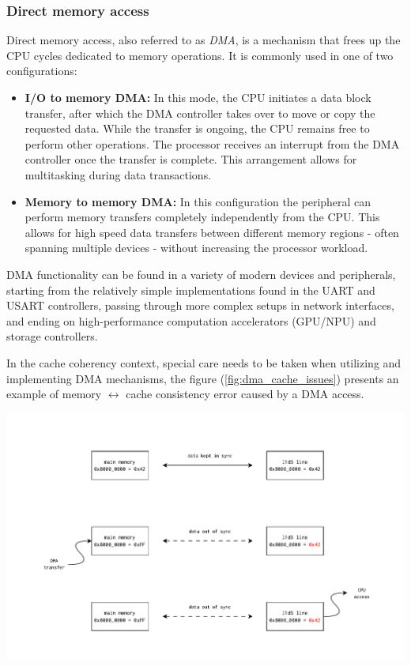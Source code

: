 \subsubsection{Direct memory access} \label{sec:dma}
Direct memory access, also referred to as \textit{DMA}, is a mechanism that
frees up the CPU cycles dedicated to memory operations. It is commonly used 
in one of two configurations:

\begin{itemize}
	\item \textbf{I/O to memory DMA:} In this mode, the CPU initiates a data block
		transfer, after which the DMA controller takes over to move or copy the requested data.
		While the transfer is ongoing, the CPU remains free to perform other operations.
		The processor receives an interrupt from the DMA controller once the transfer is complete.
		This arrangement allows for multitasking during data transactions.
	\item \textbf{Memory to memory DMA:} In this configuration the peripheral can perform memory
		transfers completely independently from the CPU. This allows for high speed data transfers
		between different memory regions - often spanning multiple devices - without increasing
		the processor workload.
\end{itemize}

\noindent DMA functionality can be found in a variety of modern devices and
peripherals, starting from the relatively simple implementations found in the
UART and USART controllers, passing through more complex setups in network
interfaces, and ending on high-performance computation accelerators (GPU/NPU)
and storage controllers.

\noindent In the cache coherency context, special care needs to be
taken when utilizing and implementing DMA mechanisms, the figure
(\ref{fig:dma_cache_issues}) presents an example of memory $\leftrightarrow$
cache consistency error caused by a DMA access.

\begin{center}
	\centering
	\includegraphics[width=\textwidth]{figures/02-background/dma_cache_issues.pdf}
	\label{fig:dma_cache_issues}
\end{center}

